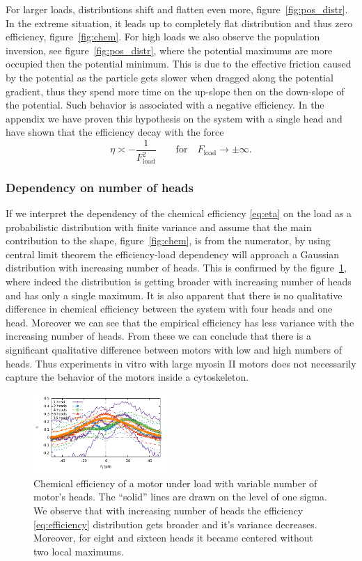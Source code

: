 \documentclass[aps,pre,twocolumn,showpacs,showkeys,superscriptaddress,floatfix]{revtex4-1}
\begin{document}
For larger loads, distributions shift and flatten even more, figure~\ref{fig:pos_distr}. 
In the extreme situation, it leads up to completely flat distribution and thus zero efficiency, figure~\ref{fig:chem}.
For high loads we also observe the population inversion, see figure~\ref{fig:pos_distr}, 
where the potential maximums are more occupied then the potential minimum. 
This is due to the effective friction caused by the potential as the particle gets slower when dragged along the potential gradient, 
thus they spend more time on the up-slope then on the down-slope of the potential.
Such behavior is associated with a negative efficiency. 
In the appendix we have proven this hypothesis on the system with a single head and have shown that the efficiency decay with the force 
\[
\eta \asymp - \frac{1}{ F_\text{load}^2 } \qquad \text{for} \quad F_\text{load} \to \pm \infty .
\]

\subsubsection{Dependency on number of heads}
If we interpret the dependency of the chemical efficiency \eqref{eq:eta} on the load as a probabilistic distribution with finite variance and assume that the main contribution to the shape, figure~\ref{fig:chem}, is from the numerator, 
by using central limit theorem the efficiency-load dependency will approach a Gaussian distribution with increasing number of heads. 
This is confirmed by the figure~\ref{fig:chem_eff_1head}, where indeed the distribution is getting broader with increasing number of heads and has only a single maximum.
It is also apparent that there is no qualitative difference in chemical efficiency between the system with four heads and one head.
Moreover we can see that the empirical efficiency has less variance with the increasing number of heads. 
From these we can conclude that there is a significant qualitative difference between motors with low and high numbers of heads. 
Thus experiments in vitro with large myosin II motors \cite{} does not necessarily capture the behavior of the motors inside a cytoskeleton. %
\begin{figure}[t]
\centering
\includegraphics[width=0.45\textwidth,height=!]{chemical_cycle_1head}
\caption{
\label{fig:chem_eff_1head}
Chemical efficiency of a motor under load with variable number of motor's heads.
The ``solid'' lines are drawn on the level of one sigma. 
We observe that with increasing number of heads the efficiency \eqref{eq:efficiency} distribution gets broader and it's variance decreases.
Moreover, for eight and sixteen heads it became centered without two local maximums.
}
\end{figure}
\end{document}
